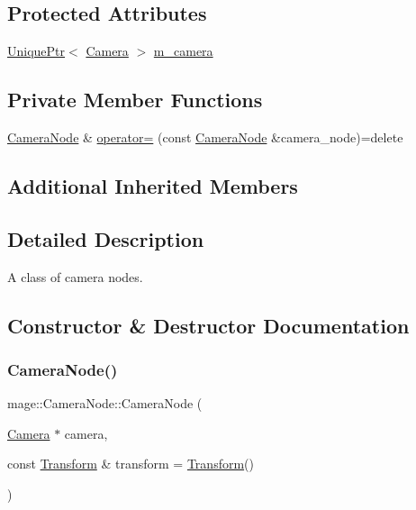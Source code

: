 \subsection*{Protected Attributes}
\begin{DoxyCompactItemize}
\item 
\hyperlink{namespacemage_a8c307fbcc33bce9b7f2aa4c26c3b95cf}{Unique\+Ptr}$<$ \hyperlink{classmage_1_1_camera}{Camera} $>$ \hyperlink{classmage_1_1_camera_node_a18f00f7ccd0c677043e11a1b3085dbfb}{m\+\_\+camera}
\end{DoxyCompactItemize}
\subsection*{Private Member Functions}
\begin{DoxyCompactItemize}
\item 
\hyperlink{classmage_1_1_camera_node}{Camera\+Node} \& \hyperlink{classmage_1_1_camera_node_a03442d51e4279717f6692e0a731967a1}{operator=} (const \hyperlink{classmage_1_1_camera_node}{Camera\+Node} \&camera\+\_\+node)=delete
\end{DoxyCompactItemize}
\subsection*{Additional Inherited Members}


\subsection{Detailed Description}
A class of camera nodes. 

\subsection{Constructor \& Destructor Documentation}
\hypertarget{classmage_1_1_camera_node_aa6b469b939b268275665f5b962b82d4a}{}\label{classmage_1_1_camera_node_aa6b469b939b268275665f5b962b82d4a} 
\subsubsection{\texorpdfstring{Camera\+Node()}{CameraNode()}\hspace{0.1cm}{\footnotesize\ttfamily [1/2]}}
{\footnotesize\ttfamily mage\+::\+Camera\+Node\+::\+Camera\+Node (\begin{DoxyParamCaption}\item[{\hyperlink{classmage_1_1_camera}{Camera} $\ast$}]{camera,  }\item[{const \hyperlink{structmage_1_1_transform}{Transform} \&}]{transform = {\ttfamily \hyperlink{structmage_1_1_transform}{Transform}()} }\end{DoxyParamCaption})}

